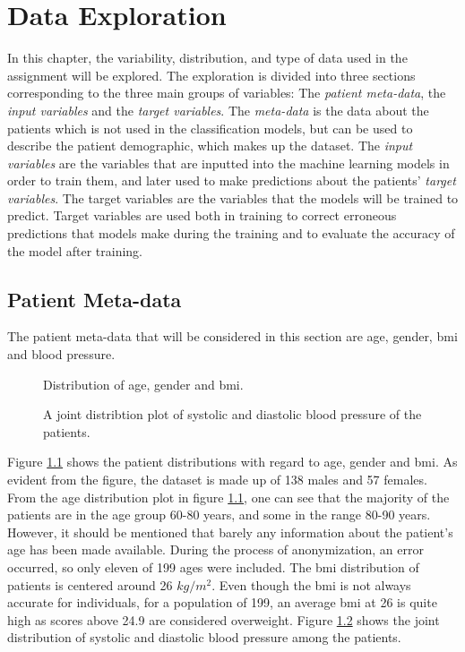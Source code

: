 \chapter{Data Exploration} \label{chap:data}

In this chapter, the variability, distribution, and type of data used in the assignment will be explored. The exploration is divided into three sections corresponding to the three main groups of variables: The \textit{patient meta-data}, the \textit{input variables} and the \textit{target variables}. The \textit{meta-data} is the data about the patients which is not used in the classification models, but can be used to describe the patient demographic, which makes up the dataset. The \textit{input variables} are the variables that are inputted into the machine learning models in order to train them, and later used to make predictions about the patients' \textit{target variables}. The target variables are the variables that the models will be trained to predict. Target variables are used both in training to correct erroneous predictions that models make during the training and to evaluate the accuracy of the model after training. \bigskip

\section{Patient Meta-data} \label{sec:metadata}
The patient meta-data that will be considered in this section are age, gender, \acrfull{bmi} and blood pressure.

\begin{figure}
    \centering
    
    \caption{Distribution of age, gender and \acrshort{bmi}.}
    \label{fig:meta_dist4}
\end{figure}

\begin{figure}
    \centering
    
    \caption{A joint distribtion plot of systolic and diastolic blood pressure of the patients.}
    \label{fig:bp_dist}
\end{figure}

Figure \ref{fig:meta_dist4} shows the patient distributions with regard to age, gender and \acrshort{bmi}. As evident from the figure, the dataset is made up of 138 males and 57 females. From the age distribution plot in figure \ref{fig:meta_dist4}, one can see that the majority of the patients are in the age group 60-80 years, and some in the range 80-90 years. However, it should be mentioned that barely any information about the patient's age has been made available. During the process of anonymization, an error occurred, so only eleven of 199 ages were included. The \acrshort{bmi} distribution of patients is centered around 26 $kg/m^2$. Even though the \acrshort{bmi} is not always accurate for individuals, for a population of 199, an average \acrshort{bmi} at 26 is quite high as scores above 24.9 are considered overweight. Figure \ref{fig:bp_dist} shows the joint distribution of systolic and diastolic blood pressure among the patients. \bigskip

